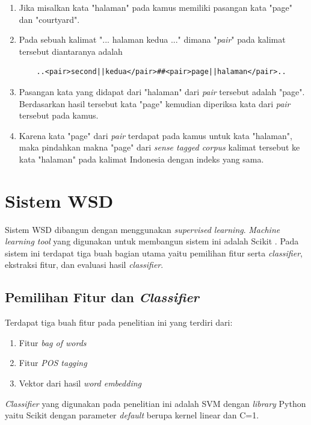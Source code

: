 \begin{enumerate}
	\item Jika misalkan kata "halaman" pada kamus memiliki pasangan kata "page" dan "courtyard".
	\item Pada sebuah kalimat "... halaman kedua ..." dimana "\textit{pair}" pada kalimat tersebut diantaranya adalah
	\begin{lstlisting}
	..<pair>second||kedua</pair>##<pair>page||halaman</pair>..
	\end{lstlisting}
	\item Pasangan kata yang didapat dari "halaman" dari \textit{pair} tersebut adalah "page". Berdasarkan hasil tersebut kata "page" kemudian diperiksa kata dari \textit{pair} tersebut pada kamus.
	\item Karena kata "page" dari \textit{pair} terdapat pada kamus untuk kata "halaman", maka pindahkan makna "page" dari \textit{sense tagged corpus} kalimat tersebut ke kata "halaman" pada kalimat Indonesia dengan indeks yang sama.
\end{enumerate}

\section{Sistem WSD}
Sistem WSD dibangun dengan menggunakan \textit{supervised learning}. \textit{Machine learning tool} yang digunakan untuk membangun sistem ini adalah Scikit \citep{scikit-learn}. Pada sistem ini terdapat tiga buah bagian utama yaitu pemilihan fitur serta \textit{classifier}, ekstraksi fitur, dan evaluasi hasil \textit{classifier}.

\subsection{Pemilihan Fitur dan \textit{Classifier}}
Terdapat tiga buah fitur pada penelitian ini yang terdiri dari:

\begin{enumerate}
	\item Fitur \textit{bag of words}
	\item Fitur \textit{POS tagging}
	\item Vektor dari hasil \textit{word embedding}
\end{enumerate}

\textit{Classifier} yang digunakan pada penelitian ini adalah SVM dengan \textit{library} Python yaitu Scikit dengan parameter \textit{default} berupa kernel linear dan C=1.

